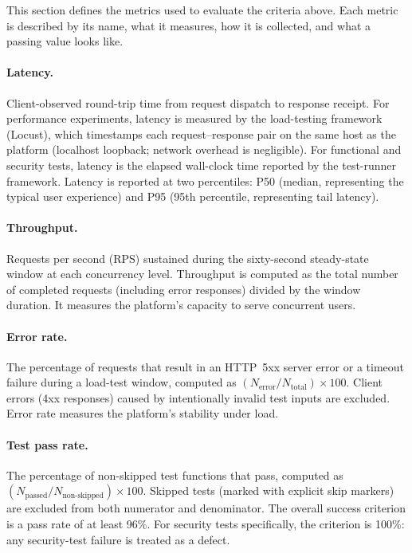 \documentclass[a4paper]{sapthesis}
\begin{document}
This section defines the metrics used to evaluate the criteria above.
Each metric is described by its name, what it measures, how it is
collected, and what a passing value looks like.

\paragraph{Latency.}
Client-observed round-trip time from request dispatch to response
receipt.  For performance experiments, latency is measured by the
load-testing framework (Locust), which timestamps each request--response
pair on the same host as the platform (localhost loopback; network
overhead is negligible).  For functional and security tests, latency is
the elapsed wall-clock time reported by the test-runner framework.
Latency is reported at two percentiles: P50 (median, representing the
typical user experience) and P95 (95th percentile, representing tail
latency).

\paragraph{Throughput.}
Requests per second (RPS) sustained during the sixty-second steady-state
window at each concurrency level.  Throughput is computed as the total
number of completed requests (including error responses) divided by the
window duration.  It measures the platform's capacity to serve concurrent
users.

\paragraph{Error rate.}
The percentage of requests that result in an HTTP~5xx server error or a
timeout failure during a load-test window, computed as
$(N_{\text{error}} / N_{\text{total}}) \times 100$.  Client errors
(4xx responses) caused by intentionally invalid test inputs are excluded.
Error rate measures the platform's stability under load.

\paragraph{Test pass rate.}
The percentage of non-skipped test functions that pass, computed as
$(N_{\text{passed}} / N_{\text{non-skipped}}) \times 100$.  Skipped
tests (marked with explicit skip markers) are excluded from both
numerator and denominator.  The overall success criterion is a pass rate
of at least 96\%.  For security tests specifically, the criterion is
100\%: any security-test failure is treated as a defect.
\end{document}
